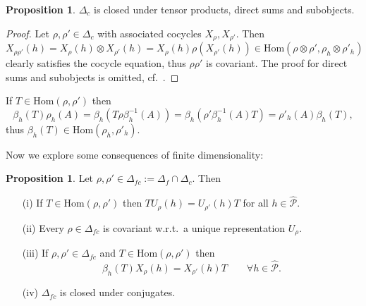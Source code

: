 \documentclass[11pt]{article}
\theoremstyle{definition}
\newtheorem{prop}[thm]{Proposition}
\theoremstyle{definition}
\theoremstyle{remark}
\def\2#1{{\mathcal #1}}
\newcommand{\Hom}{\mathrm{Hom}}
\begin{document}
\begin{prop} $\Delta_c$ is closed under tensor products, direct sums and subobjects.
\end{prop}

\begin{proof}
Let $\rho,\rho'\in\Delta_c$ with associated cocycles $X_\rho, X_{\rho'}$. Then
\begin{equation} \label{eq-Xtens}
  X_{\rho\rho'}(h)=X_{\rho}(h)\otimes
  X_{\rho'}(h)=X_{\rho}(h)\rho(X_{\rho'}(h))
  \in\Hom(\rho\otimes\rho',\rho_h\otimes\rho'_h)
\end{equation}
clearly satisfies the cocycle equation, thus
$\rho\rho'$ is covariant. The proof for direct sums and
subobjects is omitted, cf.\ \cite{rob-lec}.
\end{proof}

If $T\in\Hom(\rho,\rho')$ then 
\[
\beta_h(T)\rho_h(A)=\beta_h(T\rho\beta^{-1}_h(A))=\beta_h(\rho'\beta^{-1}_h(A)T)=\rho'_h(A)\beta_h(T), \]
thus $\beta_h(T)\in\Hom(\rho_h,\rho'_h)$.

Now we explore some consequences of finite dimensionality:

\begin{prop} \label{prop-intertw}
Let $\rho,\rho'\in\Delta_{fc}:=\Delta_f\cap\Delta_c$. Then 
\begin{itemize}
\item[(i)] If $T\in\Hom(\rho,\rho')$ then $TU_\rho(h)=U_{\rho'}(h)T$ for all $h\in\widehat{\2P}$. 
\item[(ii)] Every $\rho\in\Delta_{fc}$ is covariant w.r.t.\  a unique representation $U_\rho$.
\item[(iii)] If $\rho,\rho'\in\Delta_{fc}$ and $T\in\Hom(\rho,\rho')$ then 
\begin{equation}\label{eq-betaT} \beta_h(T)X_\rho(h)=X_{\rho'}(h)T\quad\quad\forall h\in\widehat{\2P}.
\end{equation}
\item[(iv)] $\Delta_{fc}$ is closed under conjugates.
\end{itemize}
\end{prop}
\end{document}
